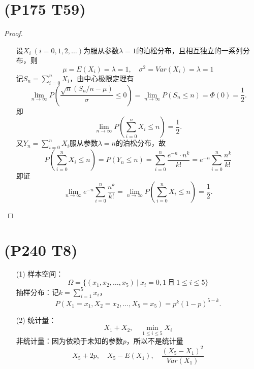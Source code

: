 \documentclass{article}
\begin{document}
\section{(P175 T59)}  %
\begin{proof}
    \begin{enumerate}
        \item []
        \item []
        设$X_i\ (i=0,1,2,\ldots)$为服从参数$\lambda = 1$的泊松分布，且相互独立的一系列分布，则
        \[
            \mu = E(X_i) = \lambda = 1,\quad
            \sigma^2 = Var(X_i) = \lambda = 1   
        \]
        记$S_n = \sum\limits_{i=0}^{n} X_i$，由中心极限定理有
        \[
            \lim\limits_{n\to \infty} P\left(\frac{\sqrt{n} (S_n / n - \mu) }{\sigma} \leq 0 \right)
            = \lim\limits_{n\to \infty} P(S_n \leq n)
            = \Phi(0)
            = \frac{1}{2}.
        \]
        即
        \[
            \lim\limits_{n\to \infty} P\left(\sum\limits_{i=0}^{n} X_i \leq n\right)     
            = \frac{1}{2}.
        \]
        又$Y_n = \sum\limits_{i=0}^{n} X_i$服从参数$\lambda = n$的泊松分布，故
        \[
            P\left( \sum\limits_{i=0}^{n} X_i \leq n \right) 
            = P\left( Y_n \leq n \right)   
            = \sum\limits_{i=0}^{n} \frac{e^{-n} \cdot n^{k}}{k!}
            = e^{-n} \sum\limits_{i=0}^{n} \frac{n^k}{k!}
        \]
        即证
        \[
            \lim\limits_{n\to \infty}e^{-n} \sum\limits_{i=0}^{n} \frac{n^k}{k!}
            = \lim\limits_{n\to \infty} P\left(\sum\limits_{i=0}^{n} X_i \leq n\right)     
            = \frac{1}{2}.
        \]
    \end{enumerate}
    
    
\end{proof}


\section{(P240 T8)}  %
\begin{enumerate}
    \item [(1)]
    样本空间：
    \[
        \Omega 
        = \{(x_1, x_2, \ldots, x_5)\ |\ x_i = 0,1\ \mbox{且} \ 1\leq i \leq 5 \}
    \]
    抽样分布：$记k = \sum\limits_{i=1}^{5} x_i$，
    \[
        P(X_1 = x_1, X_2 = x_2, \ldots, X_5 = x_5)
        = p^{k} {(1-p)}^{5 - k}.
    \]
    \item [(2)]
    统计量：
    \[
        X_1 + X_2,\quad
        \min_{1\leq i \leq 5} X_i
    \]
    非统计量：因为依赖于未知的参数$p$，所以不是统计量
    \[
        X_5+2p,\quad
        X_5 - E(X_1),\quad
        \frac{{(X_5 - X_1)}^2}{Var(X_1)}    
    \]
\end{enumerate}
\end{document}
